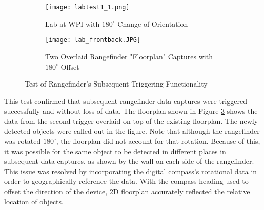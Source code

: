 \begin{figure}[H] 
	\begin{subfigure}{1\textwidth}
	\centering
		\texttt{[image: labtest1\_1.png]}
		\caption{Lab at WPI with $180^\circ$ Change of Orientation}
		\label{lab1}
	\end{subfigure}
	\begin{subfigure}{1\textwidth}
	\centering
		\texttt{[image: lab\_frontback.JPG]}
		\caption{Two Overlaid Rangefinder "Floorplan" Captures with $180^\circ$ Offset}
		\label{resultant}
	\end{subfigure}
	\caption{Test of Rangefinder's Subsequent Triggering Functionality}
	\label{labtest2}
\end{figure}

This test confirmed that subsequent rangefinder data captures were triggered successfully and without loss of data. The floorplan shown in Figure \ref{labtest2} shows the data from the second trigger overlaid on top of the existing floorplan. The newly detected objects were called out in the figure. Note that although the rangefinder was rotated $180^\circ$, the floorplan did not account for that rotation. Because of this, it was possible for the same object to be detected in different places in subsequent data captures, as shown by the wall on each side of the rangefinder. This issue was resolved by incorporating the digital compass's rotational data in order to geographically reference the data. With the compass heading used to offset the direction of the device, 2D floorplan accurately reflected the relative location of objects.




